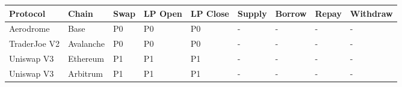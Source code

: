\documentclass[11pt,a4paper]{article}
\newcounter{none} %
\begin{document}
{\footnotesize{} %
\begin{longtable}[]{@{}
  >{\raggedright\arraybackslash}p{}
  >{\raggedright\arraybackslash}p{}
  >{\raggedright\arraybackslash}p{}
  >{\raggedright\arraybackslash}p{}
  >{\raggedright\arraybackslash}p{}
  >{\raggedright\arraybackslash}p{}
  >{\raggedright\arraybackslash}p{}
  >{\raggedright\arraybackslash}p{}
  >{\raggedright\arraybackslash}p{}@{}}
\toprule\noalign{}
\begin{minipage}[b]{\linewidth}\raggedright
Protocol
\end{minipage} & \begin{minipage}[b]{\linewidth}\raggedright
Chain
\end{minipage} & \begin{minipage}[b]{\linewidth}\raggedright
Swap
\end{minipage} & \begin{minipage}[b]{\linewidth}\raggedright
LP Open
\end{minipage} & \begin{minipage}[b]{\linewidth}\raggedright
LP Close
\end{minipage} & \begin{minipage}[b]{\linewidth}\raggedright
Supply
\end{minipage} & \begin{minipage}[b]{\linewidth}\raggedright
Borrow
\end{minipage} & \begin{minipage}[b]{\linewidth}\raggedright
Repay
\end{minipage} & \begin{minipage}[b]{\linewidth}\raggedright
Withdraw
\end{minipage} \\
\midrule\noalign{}
\endhead
\bottomrule\noalign{}
\endlastfoot
Aerodrome & Base & P0 & P0 & P0 & - & - & - & - \\
TraderJoe V2 & Avalanche & P0 & P0 & P0 & - & - & - & - \\
Uniswap V3 & Ethereum & P1 & P1 & P1 & - & - & - & - \\
Uniswap V3 & Arbitrum & P1 & P1 & P1 & - & - & - & - \\

\end{longtable}}
\end{document}
